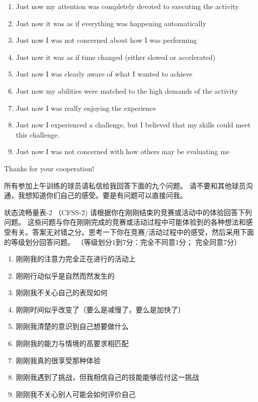 \begin{CJK}{UTF8}{gbsn}
\begin{enumerate}
  \item Just now my attention was completely devoted to executing the activity
  \item Just now it was as if everything was happening automatically
  \item Just now I was not concerned about how I was performing
  \item Just now it was as if time changed (either slowed or accelerated)
  \item Just now I was clearly aware of what I wanted to achieve
  \item Just now my abilities were matched to the high demands of the activity
  \item Just now I was really enjoying the experience
  \item Just now I experienced a challenge, but I believed that my skills could meet this challenge.
  \item Just now I was not concerned with how others may be evaluating me
\end{enumerate}

Thanks for your cooperation!




所有参加上午训练的球员请私信给我回答下面的九个问题。
请不要和其他球员沟通，我想知道你们自己的感受。要是有问题可以直接问我。


状态流畅量表-2 （CFSS-2)
请根据你在刚刚结束的竞赛或活动中的体验回答下列问题。 这些问题与你在刚刚完成的竞赛或活动过程中可能体验到的各种想法和感受有关。答案无对错之分。思考一下你在竞赛/活动过程中的感受，然后采用下面的等级划分回答问题。  （等级划分1到7分：完全不同意1分； 完全同意7分）

\begin{enumerate}
  \item 刚刚我的注意力完全正在进行的活动上
  \item 刚刚行动似乎是自然而然发生的
  \item 刚刚我不关心自己的表现如何
  \item 刚刚时间似乎改变了（要么是减慢了，要么是加快了）
  \item 刚刚我清楚的意识到自己想要做什么
  \item 刚刚我的能力与情境的高要求相匹配
  \item 刚刚我真的很享受那种体验
  \item 刚刚我遇到了挑战，但我相信自己的技能能够应付这一挑战
  \item 刚刚我不关心别人可能会如何评价自己
\end{enumerate}


\end{CJK}
